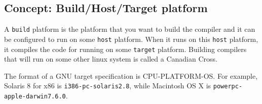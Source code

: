 %   
%   
%   
%   





\subsection{Concept: Build/Host/Target platform}
\label{sec:build-host-target}

A \verb!build! platform is the platform that you want to build the compiler
and it can be configured to run on some \verb!host! platform.
When it runs on this \verb!host! platform, it compiles the code
for running on some \verb!target! platform. 
Building compilers that will run on some other linux system is called a Canadian Cross.


The format of a GNU target specification is CPU-PLATFORM-OS. For example,
Solaris 8 for x86 is \verb!i386-pc-solaris2.8!, while Macintosh OS X is
\verb!powerpc-apple-darwin7.6.0!.

